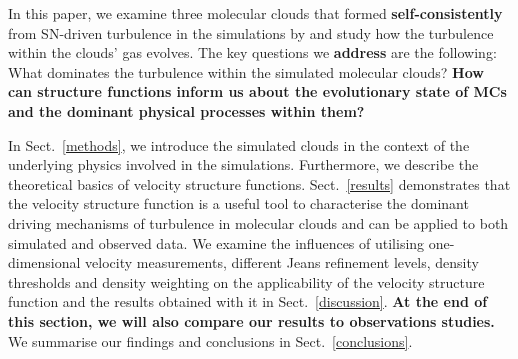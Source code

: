 In this paper, we examine three molecular clouds that formed \textbf{self-consistently} from SN-driven turbulence in the simulations by \citet[ and  hereafter]{IbanezMejia2016,IbanezMejia2017} and study how the turbulence within the clouds' gas evolves.
The key questions we \textbf{address} are the following: 
What dominates the turbulence within the simulated molecular clouds? 
\textbf{How can structure functions inform us about the evolutionary state of MCs and the dominant physical processes within them?}

In Sect.~\ref{methods}, we introduce the simulated clouds in the context of the underlying physics involved in the simulations.
Furthermore, we describe the theoretical basics of velocity structure functions.
Sect.~\ref{results} demonstrates that the velocity structure function is a useful tool to characterise the dominant driving mechanisms of turbulence in molecular clouds and can be applied to both simulated and observed data. 
We examine the influences of utilising one-dimensional velocity measurements, different Jeans refinement levels, density thresholds and density weighting on the applicability of the velocity structure function and the results obtained with it in Sect.~\ref{discussion}.  
\textbf{At the end of this section, we will also compare our results to observations studies.}
We summarise our findings and conclusions in Sect.~\ref{conclusions}.



\endinput
